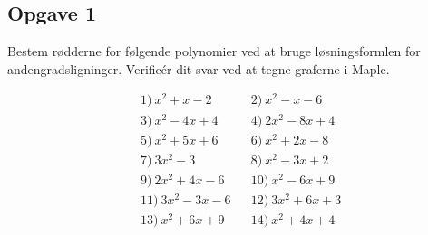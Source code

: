 \subsection*{Opgave 1}
Bestem rødderne for følgende polynomier ved at bruge løsningsformlen for andengradsligninger. Verificér dit svar ved at tegne graferne i Maple. 

\begin{align*}
&1) \ x^2 + x - 2    &&2) \ x^2 - x - 6  \\
&3) \ x^2 - 4 x + 4    &&4) \ 2x^2-8x+4  \\
&5) \ x^2 + 5 x + 6   &&6) \ x^2 + 2 x - 8 \\
&7) \ 3x^2-3   &&8) \ x^2-3x+2  \\
&9) \ 2x^2+4x - 6    &&10) \ x^2 - 6 x + 9   \\
&11) \ 3 x^2 - 3 x - 6  &&12) \ 3 x^2 + 6 x + 3    \\
&13) \ x^2 + 6 x + 9 &&14) \ x^2 + 4x + 4   \\
\end{align*}

